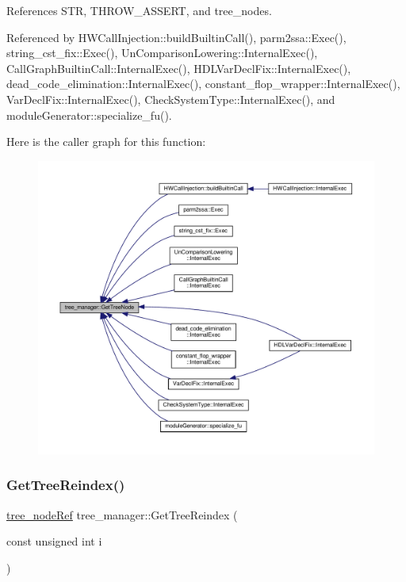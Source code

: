 References S\+TR, T\+H\+R\+O\+W\+\_\+\+A\+S\+S\+E\+RT, and tree\+\_\+nodes.



Referenced by H\+W\+Call\+Injection\+::build\+Builtin\+Call(), parm2ssa\+::\+Exec(), string\+\_\+cst\+\_\+fix\+::\+Exec(), Un\+Comparison\+Lowering\+::\+Internal\+Exec(), Call\+Graph\+Builtin\+Call\+::\+Internal\+Exec(), H\+D\+L\+Var\+Decl\+Fix\+::\+Internal\+Exec(), dead\+\_\+code\+\_\+elimination\+::\+Internal\+Exec(), constant\+\_\+flop\+\_\+wrapper\+::\+Internal\+Exec(), Var\+Decl\+Fix\+::\+Internal\+Exec(), Check\+System\+Type\+::\+Internal\+Exec(), and module\+Generator\+::specialize\+\_\+fu().

Here is the caller graph for this function\+:
\nopagebreak
\begin{figure}[H]
\begin{center}
\leavevmode
\includegraphics[width=350pt]{d2/ddd/classtree__manager_af4c6e92e486ed94a05c42a36e0825425_icgraph}
\end{center}
\end{figure}
\mbox{\label{classtree__manager_ab73b98908338fff37cdc84891befd090}} 
\subsubsection{\texorpdfstring{Get\+Tree\+Reindex()}{GetTreeReindex()}}
{\footnotesize\ttfamily \hyperlink{tree__node_8hpp_a6ee377554d1c4871ad66a337eaa67fd5}{tree\+\_\+node\+Ref} tree\+\_\+manager\+::\+Get\+Tree\+Reindex (\begin{DoxyParamCaption}\item[{const unsigned int}]{i }\end{DoxyParamCaption})}



